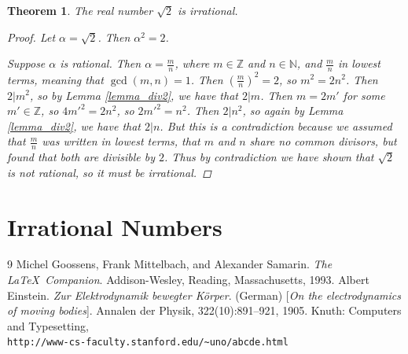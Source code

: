 \documentclass[12pt, letterpaper]{article}
\newtheorem{thm}{Theorem}
\theoremstyle{definition}
\theoremstyle{definition}
\begin{document}
\begin{thm}
    The real number \(\sqrt{2}\) is irrational.

    \begin{proof}
        Let \(\alpha = \sqrt{2}\). Then \(\alpha^2 = 2\).

        Suppose \(\alpha\) is rational. Then \(\alpha = \frac{m}{n}\), where \(m \in \mathbb{Z}\)
        and \(n \in \mathbb{N}\), and \(\frac{m}{n}\)
        in lowest terms, meaning that \(\gcd(m, n) = 1\). Then \((\frac{m}{n}) ^ 2 = 2\), so
        \(m^2 = 2n^2\). Then \(2 | m^2\), so by Lemma \ref{lemma_div2}, we have that \(2 | m\).
        Then \(m = 2m'\) for some \(m' \in \mathbb{Z}\), so \(4m'^2 = 2n^2\), so \(2m'^2 = n^2\).
        Then \(2 | n^2\), so again by Lemma \ref{lemma_div2}, we have that \(2 | n\).
        But this is a contradiction because we assumed that \(\frac{m}{n}\) was written in lowest
        terms, that \(m\) and \(n\) share no common divisors, but found that both are divisible by
        \(2\). Thus by contradiction we have shown that \(\sqrt{2}\) is not rational, so it must be irrational.
    \end{proof}
\end{thm}


\section{Irrational Numbers} \label{sec4}


\begin{thebibliography}{9}
 Michel Goossens, Frank Mittelbach, and Alexander Samarin. \textit{The \LaTeX\ Companion}. Addison-Wesley, Reading, Massachusetts, 1993.
 Albert Einstein. \textit{Zur Elektrodynamik bewegter K{\"o}rper}. (German) [\textit{On the electrodynamics of moving bodies}]. Annalen der Physik, 322(10):891–921, 1905.
 Knuth: Computers and Typesetting,\\\texttt{http://www-cs-faculty.stanford.edu/\~{}uno/abcde.html}
\end{thebibliography}
\end{document}
